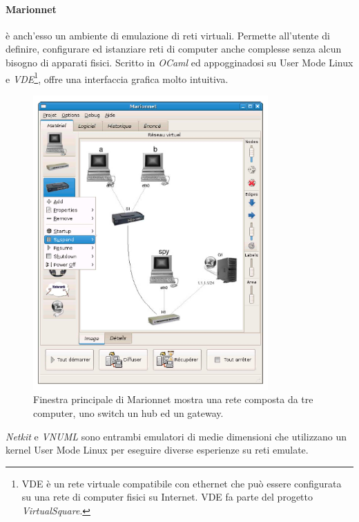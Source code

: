 \paragraph{Marionnet}\cite{MVNL08} è anch'esso un ambiente di emulazione di reti virtuali. Permette all'utente di definire, configurare ed istanziare reti di computer anche complesse senza alcun bisogno di apparati fisici. Scritto in \textit{OCaml} ed appogginadosi su User Mode Linux e \textit{VDE}\footnote{VDE è un  rete virtuale compatibile con ethernet che può essere configurata su una rete di computer fisici su Internet. VDE fa parte del progetto \textit{VirtualSquare}.}, offre una interfaccia grafica molto intuitiva.
\begin{figure}[!ht]
	\centering
	\includegraphics[width=9cm]{images/marionnet_gui.png}
	\caption{Finestra principale di Marionnet mostra una rete composta da tre computer, uno switch un hub ed un gateway.}
	\label{figura:marionnet_gui}
\end{figure}

\textit{Netkit}\cite{NETKIT}  e \textit{VNUML}\cite{VNUMLT} sono entrambi emulatori di medie dimensioni che utilizzano un kernel User Mode Linux per eseguire diverse esperienze su reti emulate.

